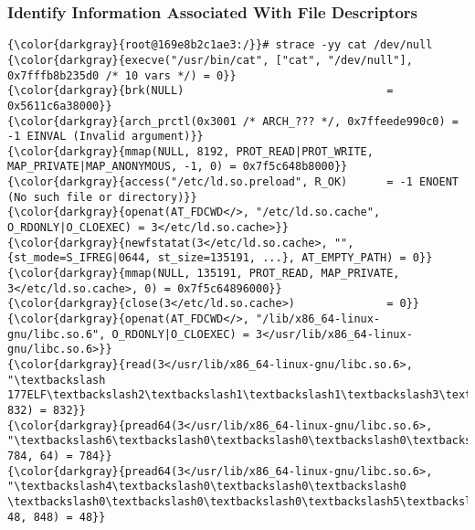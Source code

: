 {{		\subsubsection{Identify Information Associated With File Descriptors}
{\footnotesize{
\begin{Verbatim}[commandchars=\\\{\}]
{\color{darkgray}{root@169e8b2c1ae3:/}}# strace -yy cat /dev/null
{\color{darkgray}{execve("/usr/bin/cat", ["cat", "/dev/null"], 0x7fffb8b235d0 /* 10 vars */) = 0}}
{\color{darkgray}{brk(NULL)                               = 0x5611c6a38000}}
{\color{darkgray}{arch_prctl(0x3001 /* ARCH_??? */, 0x7ffeede990c0) = -1 EINVAL (Invalid argument)}}
{\color{darkgray}{mmap(NULL, 8192, PROT_READ|PROT_WRITE, MAP_PRIVATE|MAP_ANONYMOUS, -1, 0) = 0x7f5c648b8000}}
{\color{darkgray}{access("/etc/ld.so.preload", R_OK)      = -1 ENOENT (No such file or directory)}}
{\color{darkgray}{openat(AT_FDCWD</>, "/etc/ld.so.cache", O_RDONLY|O_CLOEXEC) = 3</etc/ld.so.cache>}}
{\color{darkgray}{newfstatat(3</etc/ld.so.cache>, "", {st_mode=S_IFREG|0644, st_size=135191, ...}, AT_EMPTY_PATH) = 0}}
{\color{darkgray}{mmap(NULL, 135191, PROT_READ, MAP_PRIVATE, 3</etc/ld.so.cache>, 0) = 0x7f5c64896000}}
{\color{darkgray}{close(3</etc/ld.so.cache>)              = 0}}
{\color{darkgray}{openat(AT_FDCWD</>, "/lib/x86_64-linux-gnu/libc.so.6", O_RDONLY|O_CLOEXEC) = 3</usr/lib/x86_64-linux-gnu/libc.so.6>}}
{\color{darkgray}{read(3</usr/lib/x86_64-linux-gnu/libc.so.6>, "\textbackslash 177ELF\textbackslash2\textbackslash1\textbackslash1\textbackslash3\textbackslash0\textbackslash0\textbackslash0\textbackslash0\textbackslash0\textbackslash0\textbackslash0\textbackslash0\textbackslash3\textbackslash0>\textbackslash0\textbackslash1\textbackslash0\textbackslash0\textbackslash0P\textbackslash237\textbackslash2\textbackslash0\textbackslash0\textbackslash0\textbackslash0\textbackslash0"..., 832) = 832}}
{\color{darkgray}{pread64(3</usr/lib/x86_64-linux-gnu/libc.so.6>, "\textbackslash6\textbackslash0\textbackslash0\textbackslash0\textbackslash4\textbackslash0\textbackslash0\textbackslash0@\textbackslash0\textbackslash0\textbackslash0\textbackslash0\textbackslash0\textbackslash0\textbackslash0@\textbackslash0\textbackslash0\textbackslash0\textbackslash0\textbackslash0\textbackslash0\textbackslash0@\textbackslash0\textbackslash0\textbackslash0\textbackslash0\textbackslash0\textbackslash0\textbackslash0"..., 784, 64) = 784}}
{\color{darkgray}{pread64(3</usr/lib/x86_64-linux-gnu/libc.so.6>, "\textbackslash4\textbackslash0\textbackslash0\textbackslash0 \textbackslash0\textbackslash0\textbackslash0\textbackslash5\textbackslash0\textbackslash0\textbackslash0GNU\textbackslash0\textbackslash2\textbackslash0\textbackslash0\textbackslash300\textbackslash4\textbackslash0\textbackslash0\textbackslash0\textbackslash3\textbackslash0\textbackslash0\textbackslash0\textbackslash0\textbackslash0\textbackslash0\textbackslash0"..., 48, 848) = 48}}

\end{Verbatim}}}}}

